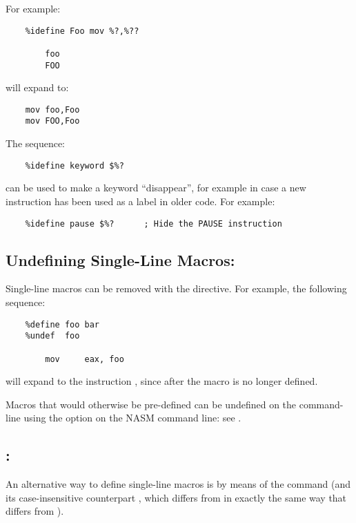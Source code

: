 For example:

\begin{lstlisting}
	%idefine Foo mov %?,%??

		foo
		FOO
\end{lstlisting}

will expand to:

\begin{lstlisting}
	mov foo,Foo
	mov FOO,Foo
\end{lstlisting}

The sequence:

\begin{lstlisting}
	%idefine keyword $%?
\end{lstlisting}

can be used to make a keyword ``disappear'', for example in case a new
instruction has been used as a label in older code.  For example:

\begin{lstlisting}
	%idefine pause $%?		; Hide the PAUSE instruction
\end{lstlisting}

\subsection{Undefining Single-Line Macros: }
\label{subsec:undef}

Single-line macros can be removed with the  directive.
For example, the following sequence:

\begin{lstlisting}
	%define foo bar
	%undef  foo

		mov     eax, foo
\end{lstlisting}

will expand to the instruction , since after
 the macro  is no longer defined.

Macros that would otherwise be pre-defined can be undefined on the
command-line using the  option on the NASM command line:
see .

\subsection{: }
\label{subsec:assign}

An alternative way to define single-line macros is by means of the
 command (and its case-insensitive
counterpart , which differs from  in
exactly the same way that  differs from ).

